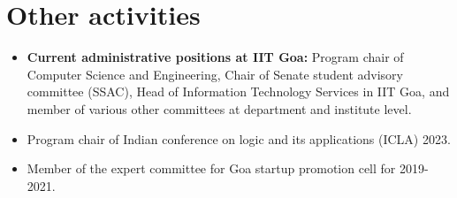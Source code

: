 \documentclass[11pt,a4paper,sans]{moderncv} %
\begin{document}
\section{Other activities}
\begin{itemize}
 \item \textbf{Current administrative positions at IIT Goa:} Program chair of Computer Science and Engineering, Chair of Senate student advisory committee (SSAC), Head of Information Technology Services in IIT Goa, and member of various other committees at department and institute level.
 \item Program chair of Indian conference on logic and its applications (ICLA) 2023.
 \item Member of the expert committee for Goa startup promotion cell for 2019-2021.
\end{itemize}


\end{document}
